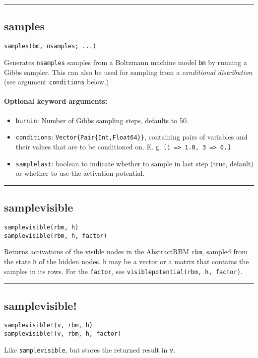 \noindent\rule{\textwidth}{1pt}
\subsection*{samples}  \label{bms_samples}
\begin{verbatim}
samples(bm, nsamples; ...)
\end{verbatim}
Generates \texttt{nsamples} samples from a Boltzmann machine model \texttt{bm} by running a Gibbs sampler. This can also be used for sampling from a \emph{conditional distribution} (see argument \texttt{conditions} below.)

\paragraph*{Optional keyword arguments:}
\begin{itemize}
\item \texttt{burnin}: Number of Gibbs sampling steps, defaults to 50.


\item \texttt{conditions}: \texttt{Vector\{Pair\{Int,Float64\}\}}, containing pairs of variables and their values that are to be conditioned on. E. g. \texttt{[1 => 1.0, 3 => 0.]}


\item \texttt{samplelast}: boolean to indicate whether to sample in last step (true, default) or whether to use the activation potential.

\end{itemize}
\noindent\rule{\textwidth}{1pt}
\subsection*{samplevisible}  \label{bms_samplevisible}
\begin{verbatim}
samplevisible(rbm, h)
samplevisible(rbm, h, factor)
\end{verbatim}
Returns activations of the visible nodes in the AbstractRBM \texttt{rbm}, sampled from the state \texttt{h} of the hidden nodes. \texttt{h} may be a vector or a matrix that contains the samples in its rows. For the \texttt{factor}, see \texttt{visiblepotential(rbm, h, factor)}.

\noindent\rule{\textwidth}{1pt}
\subsection*{samplevisible!}  \label{bms_samplevisible!}
\begin{verbatim}
samplevisible!(v, rbm, h)
samplevisible!(v, rbm, h, factor)
\end{verbatim}
Like \texttt{samplevisible}, but stores the returned result in \texttt{v}.

